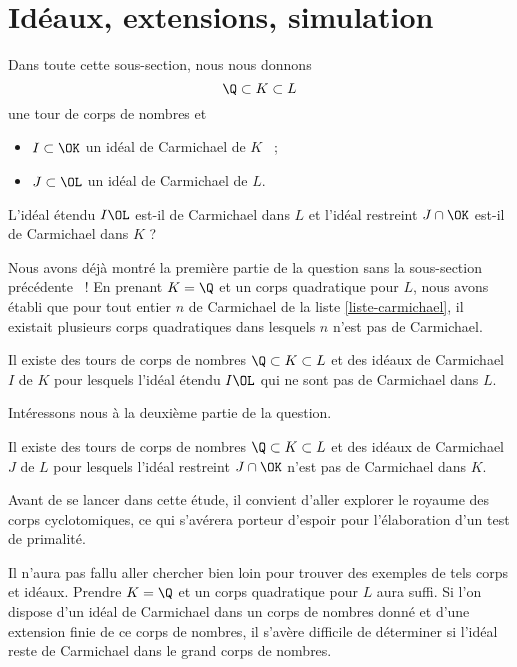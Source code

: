\section{Idéaux, extensions, simulation}

Dans toute cette sous-section, nous nous donnons $$\Q\subset K \subset L$$ une tour de corps de nombres et \begin{itemize}
	\item $I\subset \OK$ un idéal de Carmichael de $K$ ~;
	\item $J \subset \OL$ un idéal de Carmichael de $L$.
\end{itemize}

\begin{question}
	L'idéal étendu $I\OL$ est-il de Carmichael dans $L$ et l'idéal restreint $J\cap\OK$ est-il de Carmichael dans $K$ ?
\end{question}

Nous avons déjà montré la première partie de la question sans la sous-section précédente ~! En prenant $K=\Q$ et un corps quadratique pour $L$, nous avons établi que pour tout entier $n$ de Carmichael de la liste \ref{liste-carmichael}, il existait plusieurs corps quadratiques dans lesquels $n$ n'est pas de Carmichael. 

\begin{proposition}\label{premier-ce}
	Il existe des tours de corps de nombres $\Q\subset K \subset L$ et des idéaux de Carmichael $I$ de $K$ pour lesquels l'idéal étendu $I\OL$ qui ne sont pas de Carmichael dans $L$.
\end{proposition}

Intéressons nous à la deuxième partie de la question.

\begin{proposition}\label{deuxieme-ce}
	Il existe des tours de corps de nombres $\Q\subset K \subset L$ et des idéaux de Carmichael $J$ de $L$ pour lesquels l'idéal restreint $J\cap \OK$ n'est pas de Carmichael dans $K$.
\end{proposition}

Avant de se lancer dans cette étude, il convient d'aller explorer le royaume des corps cyclotomiques, ce qui s'avérera porteur d'espoir pour l'élaboration d'un test de primalité. 

Il n'aura pas fallu aller chercher bien loin pour trouver des exemples de tels corps et idéaux. Prendre $K = \Q$ et un corps quadratique pour $L$ aura suffi. Si l'on dispose d'un idéal de Carmichael dans un corps de nombres donné et d'une extension finie de ce corps de nombres, il s'avère difficile de déterminer si l'idéal reste de Carmichael dans le grand corps de nombres.

